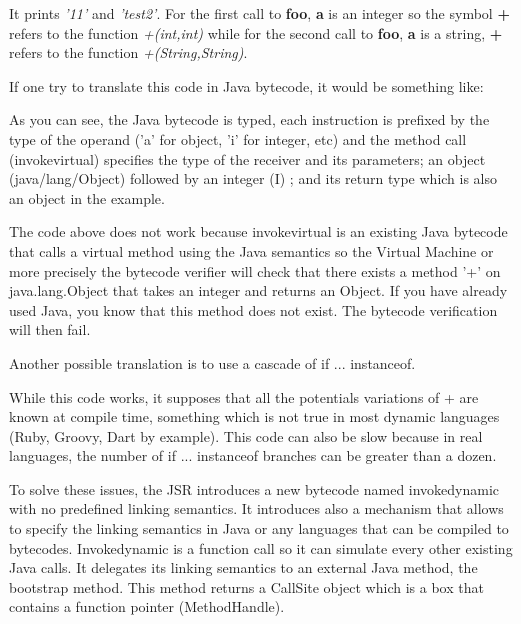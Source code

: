 \documentclass{sig-alternate}
\def \Jsr{JSR\xspace}
\begin{document}
      It prints {\it '11'} and {\it 'test2'}.
      For the first call to {\bf foo}, {\bf a} is an integer so the symbol {\bf +} refers
      to the function {\it +(int,int)} while for the second call to {\bf foo}, {\bf a} is a string, {\bf +} refers to the function {\it +(String,String)}.

      If one try to translate this code in Java bytecode, it would be something like:

      

      As you can see, the Java bytecode is typed, each instruction is prefixed 
      by the type of the operand ('a' for object, 'i' for integer, etc)
      and the method call (invokevirtual) specifies the type of the receiver and its parameters;
      an object (java/lang/Object) followed by an integer (I) ; and its return type
      which is also an object in the example.

      The code above does not work because invokevirtual is an existing Java bytecode that calls
      a virtual method using the Java semantics so the Virtual Machine or more precisely
      the bytecode verifier will check that there exists a method '+' on java.lang.Object
      that takes an integer and returns an Object. If you have already used Java, you know
      that this method does not exist. The bytecode verification will then fail.

      Another possible translation is to use a cascade of if ... instanceof.

      

      While this code works, it supposes that all the potentials variations of + are known at compile time,
      something which is not true in most dynamic languages (Ruby, Groovy, Dart by example).
      This code can also be slow because in real languages, the number of if ... instanceof branches
      can be greater than a dozen. 

      To solve these issues, the \Jsr introduces a new bytecode named invokedynamic with no predefined
      linking semantics. It introduces also a mechanism that allows to specify the linking semantics in Java
      or any languages that can be compiled to bytecodes.
      Invokedynamic is a function call so it can simulate every other existing Java calls.
      It delegates its linking semantics to an external Java method, the bootstrap method.
      This method returns a CallSite object which is a box that contains a function pointer (MethodHandle).
\end{document}
